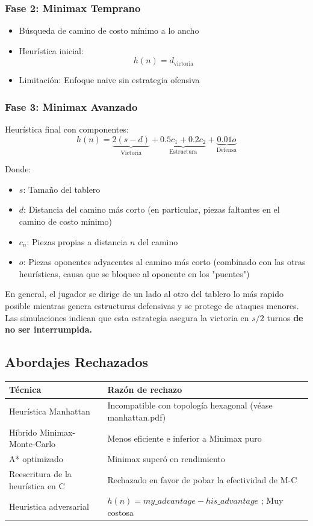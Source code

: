 \documentclass{article}
\begin{document}
\subsubsection*{Fase 2: Minimax Temprano}
\begin{itemize}
\item Búsqueda de camino de costo mínimo a lo ancho
\item Heurística inicial:
\[ h(n) = d_{\text{victoria}} \]
\item Limitación: Enfoque naive sin estrategia ofensiva
\end{itemize}

\subsubsection*{Fase 3: Minimax Avanzado}
Heurística final con componentes:
\[ h(n) = \underbrace{2(s - d)}_{\text{Victoria}} + \underbrace{0.5c_1 + 0.2c_2}_{\text{Estructura}} + \underbrace{0.01o}_{\text{Defensa}} \]

Donde:
\begin{itemize}
\item $s$: Tamaño del tablero
\item $d$: Distancia del camino más corto (en particular, piezas faltantes en el camino de costo mínimo)
\item $c_n$: Piezas propias a distancia $n$ del camino
\item $o$: Piezas oponentes adyacentes al camino más corto (combinado con las otras heurísticas, causa que se bloquee al oponente en los "puentes")
\end{itemize}

En general, el jugador se dirige de un lado al otro del tablero lo más rapido posible mientras genera estructuras defensivas y se protege de ataques menores.
Las simulaciones indican que esta estrategia asegura la victoria en $s/2$ turnos \bfseries{de no ser interrumpida}.

\subsection{Abordajes Rechazados}
\begin{table}[h]
\centering
\begin{tabular}{|l|l|}
\hline
\textbf{Técnica} & \textbf{Razón de rechazo} \\
\hline
Heurística Manhattan & Incompatible con topología hexagonal (véase manhattan.pdf) \\
Híbrido Minimax-Monte-Carlo & Menos eficiente e inferior a Minimax puro\\
A* optimizado & Minimax superó en rendimiento \\
Reescritura de la heurística en C &  Rechazado en favor de pobar la efectividad de M-C\\
Heuristica adversarial &  $h(n) = my\_advantage - his\_advantage $ ; Muy costosa \\
\hline
\end{tabular}
\end{table}
\end{document}
